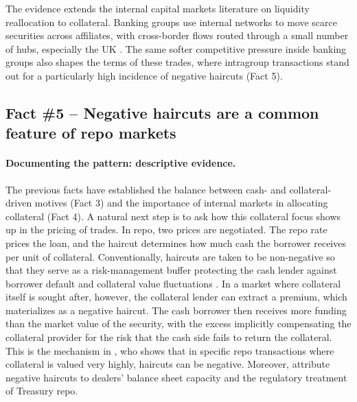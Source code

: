 \documentclass[english, 12pt, oneside]{article}
\begin{document}
\begin{table}[tbp]
\label{tab:specialness_intragroup}
\end{table}


The evidence extends the internal capital markets literature on liquidity reallocation \citep{deHaas2010, cetorelli2011, cetorelli2012a, houston2012} to collateral. Banking groups use internal networks to move scarce securities across affiliates, with cross-border flows routed through a small number of hubs, especially the UK \citep{mcguire2024, hardy2024}. The same softer competitive pressure inside banking groups also shapes the terms of these trades, where intragroup transactions stand out for a particularly high incidence of negative haircuts (Fact 5).


\subsection[Fact \#5 -- Negative haircuts are a common feature of repo markets]{Fact \#5 -- Negative haircuts are a common feature of repo markets}
\label{subsec:fact5}

\paragraph{Documenting the pattern: descriptive evidence.}
The previous facts have established  the balance between cash- and collateral-driven motives (Fact 3) and the importance of internal markets in allocating collateral (Fact 4). A natural next step is to ask how this collateral focus shows up in the pricing of trades. In repo, two prices are negotiated. The repo rate prices the loan, and the haircut determines how much cash the borrower receives per unit of collateral. Conventionally, haircuts are taken to be non-negative so that they serve as a risk-management buffer protecting the cash lender against borrower default and collateral value fluctuations \citep{gorton2010, copeland2014, krishnamurthy2014, gottardi2019}. In a market where collateral itself is sought after, however, the collateral lender can extract a premium, which materializes as a negative haircut. The cash borrower then receives more funding than the market value of the security, with the excess implicitly compensating the collateral provider for the risk that the cash side fails to return the collateral. This is the mechanism in \citet{infante2019}, who shows that in specific repo transactions where collateral is valued very highly, haircuts can be negative. Moreover, \citet{bejarano2025} attribute negative haircuts to dealers' balance sheet capacity and the regulatory treatment of Treasury repo. 
\end{document}
